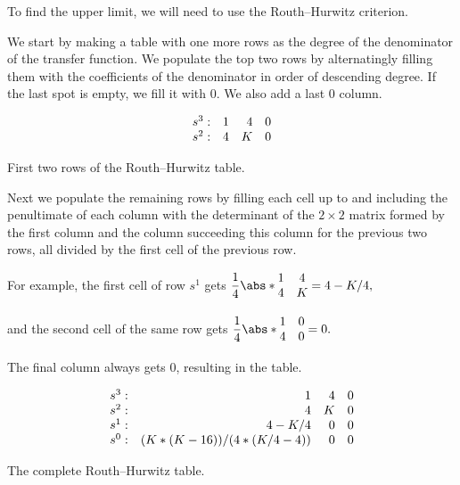 \documentclass[12pt]{article}
\DeclarePairedDelimiter\abs||
\begin{document}
To find the upper limit, we will need to use the Routh--Hurwitz criterion.

We start by making a table with one more rows as the degree of the denominator of the transfer function.
We populate the top two rows by alternatingly filling them with the coefficients of the denominator in order of descending degree.
If the last spot is empty, we fill it with $0$. We also add a last $0$ column.

\begin{table}[h]
    \centering
    \[
        \begin{array}{@{}*4r@{}}
            s^3: &                          1 & 4 & 0 \\*
            s^2: &                          4 & K & 0 \\*
        \end{array}
    \]
    \caption{First two rows of the Routh--Hurwitz table.}
    \label{tab:rh table 1st 2 rows}
\end{table}

Next we populate the remaining rows by filling each cell up to and including the penultimate of each column with the determinant of the $2\times2$ matrix formed by the first column and the column succeeding this column for the previous two rows, all divided by the first cell of the previous row.

For example, the first cell of row $s^1$ gets
$
    \dfrac14\abs*{
        \begin{matrix} 1 & 4 \\* 4 & K\end{matrix}
    } = 4 - K/4,
$

and the second cell of the same row gets
$
    \dfrac14\abs*{
        \begin{matrix} 1 & 0 \\* 4 & 0\end{matrix}
    } = 0.
$

The final column always gets $0$, resulting in the table.

\begin{table}[h]
    \centering
    \[
        \begin{array}{@{}*4r@{}}
            s^3: &                          1 & 4 & 0 \\*
            s^2: &                          4 & K & 0 \\*
            s^1: &                    4 - K/4 & 0 & 0 \\*
            s^0: & (K*(K - 16))/(4*(K/4 - 4)) & 0 & 0 \\*
        \end{array}
    \]
    \caption{The complete Routh--Hurwitz table.}
    \label{tab:rh table complete}
\end{table}
\end{document}
